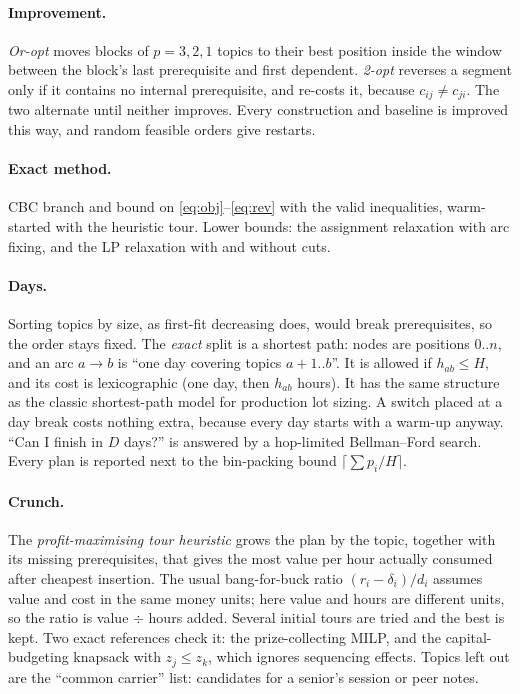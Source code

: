 \documentclass[11pt,a4paper]{article}
\begin{document}
\paragraph{Improvement.} \emph{Or-opt} moves blocks of $p=3,2,1$ topics to their best position inside the window between the block's last prerequisite and first dependent. \emph{2-opt} reverses a segment only if it contains no internal prerequisite, and re-costs it, because $c_{ij}\ne c_{ji}$. The two alternate until neither improves. Every construction and baseline is improved this way, and random feasible orders give restarts.

\paragraph{Exact method.}
\label{sec:exact}
CBC branch and bound \citep{pulp} on \eqref{eq:obj}--\eqref{eq:rev} with the valid inequalities, warm-started with the heuristic tour. Lower bounds: the assignment relaxation with arc fixing, and the LP relaxation with and without cuts.

\paragraph{Days.}
\label{sec:days}
Sorting topics by size, as first-fit decreasing does, would break prerequisites, so the order stays fixed. The \emph{exact} split is a shortest path: nodes are positions $0..n$, and an arc $a\to b$ is ``one day covering topics $a{+}1..b$''. It is allowed if $h_{ab}\le H$, and its cost is lexicographic (one day, then $h_{ab}$ hours). It has the same structure as the classic shortest-path model for production lot sizing. A switch placed at a day break costs nothing extra, because every day starts with a warm-up anyway. ``Can I finish in $D$ days?'' is answered by a hop-limited Bellman--Ford search. Every plan is reported next to the bin-packing bound $\lceil\sum p_i/H\rceil$.

\paragraph{Crunch.} The \emph{profit-maximising tour heuristic} grows the plan by the topic, together with its missing prerequisites, that gives the most value per hour actually consumed after cheapest insertion. The usual bang-for-buck ratio $(r_i-\delta_i)/d_i$ assumes value and cost in the same money units; here value and hours are different units, so the ratio is value $\div$ hours added. Several initial tours are tried and the best is kept. Two exact references check it: the prize-collecting MILP, and the capital-budgeting knapsack with $z_j\le z_k$, which ignores sequencing effects. Topics left out are the ``common carrier'' list: candidates for a senior's session or peer notes.
\end{document}
